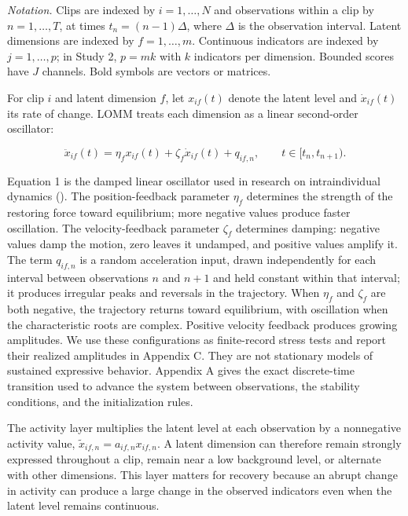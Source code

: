 \documentclass[
]{article}
\begin{document}
\emph{Notation.} Clips are indexed by \(i=1,\ldots,N\) and observations
within a clip by \(n=1,\ldots,T\), at times \(t_n=(n-1)\Delta\), where
\(\Delta\) is the observation interval. Latent dimensions are indexed by
\(f=1,\ldots,m\). Continuous indicators are indexed by \(j=1,\ldots,p\);
in Study 2, \(p=mk\) with \(k\) indicators per dimension. Bounded scores
have \(J\) channels. Bold symbols are vectors or matrices.

For clip \(i\) and latent dimension \(f\), let \(x_{if}(t)\) denote the
latent level and \(\dot{x}_{if}(t)\) its rate of change. LOMM treats
each dimension as a linear second-order oscillator:

\begin{equation}
\ddot{x}_{if}(t)
=
\eta_f x_{if}(t)
+
\zeta_f\dot{x}_{if}(t)
+
q_{if,n},
\qquad t\in[t_n,t_{n+1}).
\label{eq:lomm-latent}
\end{equation}

Equation 1 is the damped linear oscillator used in research on
intraindividual dynamics (). The position-feedback parameter \(\eta_f\)
determines the strength of the restoring force toward equilibrium; more
negative values produce faster oscillation. The velocity-feedback
parameter \(\zeta_f\) determines damping: negative values damp the
motion, zero leaves it undamped, and positive values amplify it. The
term \(q_{if,n}\) is a random acceleration input, drawn independently
for each interval between observations \(n\) and \(n+1\) and held
constant within that interval; it produces irregular peaks and reversals
in the trajectory. When \(\eta_f\) and \(\zeta_f\) are both negative,
the trajectory returns toward equilibrium, with oscillation when the
characteristic roots are complex. Positive velocity feedback produces
growing amplitudes. We use these configurations as finite-record stress
tests and report their realized amplitudes in Appendix C. They are not
stationary models of sustained expressive behavior. Appendix A gives the
exact discrete-time transition used to advance the system between
observations, the stability conditions, and the initialization rules.

The activity layer multiplies the latent level at each observation by a
nonnegative activity value, \(\tilde{x}_{if,n}=a_{if,n}x_{if,n}\). A
latent dimension can therefore remain strongly expressed throughout a
clip, remain near a low background level, or alternate with other
dimensions. This layer matters for recovery because an abrupt change in
activity can produce a large change in the observed indicators even when
the latent level remains continuous.
\end{document}
